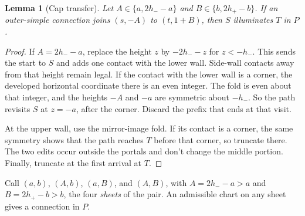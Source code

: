 \documentclass[11pt]{article}
\newtheorem{lemma}{Lemma}
\theoremstyle{remark}
\begin{document}
\begin{lemma}[Cap transfer]\label{lem:cap}
Let $A\in\{a,2h_--a\}$ and $B\in\{b,2h_+-b\}$. If an outer-simple connection joins $(s,-A)$ to $(t,1+B)$, then $S$ illuminates $T$ in $P$.
\end{lemma}
\begin{proof}
If $A=2h_--a$, replace the height $z$ by $-2h_--z$ for $z<-h_-$. This sends the start to $S$ and adds one contact with the lower wall. Side-wall contacts away from that height remain legal. If the contact with the lower wall is a corner, the developed horizontal coordinate there is an even integer. The fold is even about that integer, and the heights $-A$ and $-a$ are symmetric about $-h_-$. So the path revisits $S$ at $z=-a$, after the corner. Discard the prefix that ends at that visit.

At the upper wall, use the mirror-image fold. If its contact is a corner, the same symmetry shows that the path reaches $T$ before that corner, so truncate there. The two edits occur outside the portals and don't change the middle portion. Finally, truncate at the first arrival at $T$.
\end{proof}

Call $(a,b)$, $(A,b)$, $(a,B)$, and $(A,B)$, with $A=2h_--a>a$ and $B=2h_+-b>b$, the four \emph{sheets} of the pair. An admissible chart on any sheet gives a connection in $P$.
\end{document}
